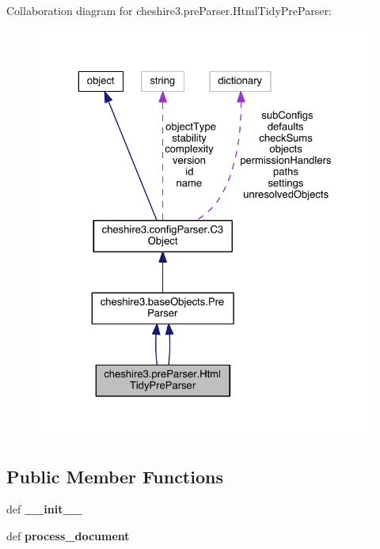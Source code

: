 Collaboration diagram for cheshire3.\-pre\-Parser.\-Html\-Tidy\-Pre\-Parser\-:
\nopagebreak
\begin{figure}[H]
\begin{center}
\leavevmode
\includegraphics[width=325pt]{classcheshire3_1_1pre_parser_1_1_html_tidy_pre_parser__coll__graph}
\end{center}
\end{figure}
\subsection*{Public Member Functions}
\begin{DoxyCompactItemize}
\item 
\hypertarget{classcheshire3_1_1pre_parser_1_1_html_tidy_pre_parser_a58b2bd1b7408d7e298db5d8bdaabf607}{def {\bfseries \-\_\-\-\_\-init\-\_\-\-\_\-}}\label{classcheshire3_1_1pre_parser_1_1_html_tidy_pre_parser_a58b2bd1b7408d7e298db5d8bdaabf607}

\item 
\hypertarget{classcheshire3_1_1pre_parser_1_1_html_tidy_pre_parser_aed7478b1432a93a454173044872da9ab}{def {\bfseries process\-\_\-document}}\label{classcheshire3_1_1pre_parser_1_1_html_tidy_pre_parser_aed7478b1432a93a454173044872da9ab}

\end{DoxyCompactItemize}
